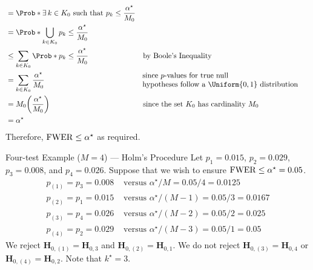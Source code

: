 \begin{Proof}{ \dagger}{}
\begin{align*}
         & =\Prob*{\exists\, k\in K_0\text{ such that }p_k\le \frac{\alpha^\star}{M_0}}                                                                              \\
         & =\Prob*{\bigcup_{k\in K_0}p_k\le \frac{\alpha^\star}{M_0}}                                                                                                \\
         & \le \sum_{k\in K_0}\Prob*{p_k\le \frac{\alpha^\star}{M_0}}                   &  & \text{by Boole's Inequality}                                            \\
         & =\sum_{k\in K_0}\frac{\alpha^\star}{M_0}                                     &  & \!\!\!\!\begin{tabular}{l}
                                                                                                         \text{since $p$-values for true null} \\
                                                                                                         \text{hypotheses follow a $\Uniform{0,1}$ distribution}
                                                                                                     \end{tabular} \\
         & =M_0\biggl(\frac{\alpha^\star}{M_0}\biggr)                                   &  & \text{since the set $K_0$ has cardinality $M_0$}                        \\
         & =\alpha^\star
    \end{align*}
    Therefore, $ \operatorname{FWER}\le \alpha^\star $ as required.
\end{Proof}
\begin{Example}{Four-test Example ($ M=4 $) --- Holm's Procedure}{}
    Let $ p_1=0.015 $, $ p_2=0.029 $, $ p_3=0.008 $, and $ p_4=0.026 $. Suppose that we wish to ensure
    $ \operatorname{FWER}\le \alpha^\star=0.05 $.
    \begin{align*}
        p_{(1)}=p_3=0.008 & \text{ versus } \alpha^\star/M=0.05/4=0.0125     \\
        p_{(2)}=p_1=0.015 & \text{ versus } \alpha^\star/(M-1)=0.05/3=0.0167 \\
        p_{(3)}=p_4=0.026 & \text{ versus } \alpha^\star/(M-2)=0.05/2=0.025  \\
        p_{(4)}=p_2=0.029 & \text{ versus } \alpha^\star/(M-3)=0.05/1=0.05
    \end{align*}
    We reject $ \mathbf{H}_{0,(1)}=\mathbf{H}_{0,3} $ and $ \mathbf{H}_{0,(2)}=\mathbf{H}_{0,1} $. We do not reject
    $ \mathbf{H}_{0,(3)}=\mathbf{H}_{0,4} $ or $ \mathbf{H}_{0,(4)}=\mathbf{H}_{0,2} $. Note that $ k^\star=3 $.
\end{Example}
